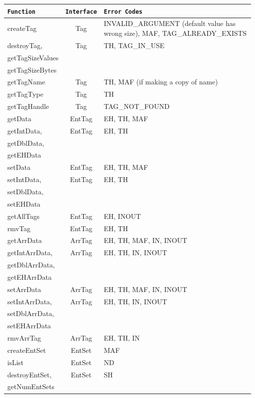 \documentclass{article}
\begin{document}
\begin{longtable}{|l|c|p{3in}|}
\hline
\textbf{{\tt Function}} & \textbf{{\tt Interface}} & \textbf{{\tt Error Codes}} \\
\hline
createTag & Tag 
          & INVALID\_ARGUMENT (default value has wrong size), MAF, TAG\_ALREADY\_EXISTS\\ 
\hline
destroyTag, & Tag & TH, TAG\_IN\_USE\\
getTagSizeValues & & \\
getTagSizeBytes & & \\
\hline
getTagName & Tag & TH, MAF (if making a copy of name)\\
\hline
getTagType & Tag & TH \\
\hline
getTagHandle & Tag & TAG\_NOT\_FOUND \\
\hline
getData& EntTag& EH, TH, MAF\\
\hline
getIntData,& EntTag& EH, TH\\
getDblData, &&\\
getEHData & & \\
\hline
setData& EntTag& EH, TH, MAF\\
\hline
setIntData,& EntTag&EH, TH\\ 
setDblData, &&\\
setEHData& &\\
\hline
getAllTags& EntTag& EH, INOUT\\
\hline
rmvTag& EntTag& EH, TH\\
\hline
getArrData& ArrTag& EH, TH, MAF, IN, INOUT\\
\hline
getIntArrData, &ArrTag& EH, TH, IN, INOUT\\
getDblArrData,&&\\
 getEHArrData& &\\
\hline

setArrData& ArrTag& EH, TH, MAF, IN, INOUT\\ 
\hline

setIntArrData, &ArrTag&EH, TH, IN, INOUT\\
setDblArrData, &&\\
setEHArrData& &\\
\hline

rmvArrTag& ArrTag& EH, TH, IN\\
\hline
createEntSet& EntSet& MAF\\
\hline
isList& EntSet& ND\\
\hline
destroyEntSet, & EntSet& SH\\
getNumEntSets & &\\
\hline


\end{longtable}
\end{document}
